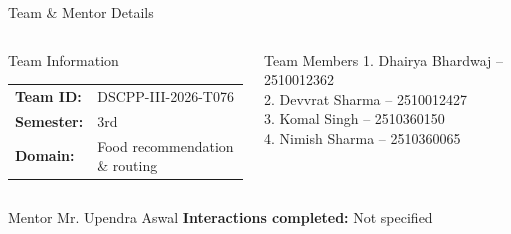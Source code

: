 \documentclass[aspectratio=169,10pt]{beamer}
\begin{document}
\begin{frame}{Team \& Mentor Details}
\begin{columns}[T,totalwidth=\textwidth]
\begin{block}{Team Information}
\begin{tabular}{@{}ll@{}}
\textbf{Team ID:} & DSCPP-III-2026-T076\\
\textbf{Semester:} & 3rd\\

\textbf{Domain:} & Food recommendation \& routing
\end{tabular}
\end{block}
\begin{block}{Team Members}
1. Dhairya Bhardwaj -- 2510012362\\[2mm]
2. Devvrat Sharma -- 2510012427\\[2mm]
3. Komal Singh -- 2510360150\\[2mm]
4. Nimish Sharma -- 2510360065
\end{block}
\end{columns}
\vspace{2mm}
\begin{block}{Mentor}
Mr. Upendra Aswal\hfill
\textbf{Interactions completed:} Not specified
\end{block}

\end{frame}
\end{document}
